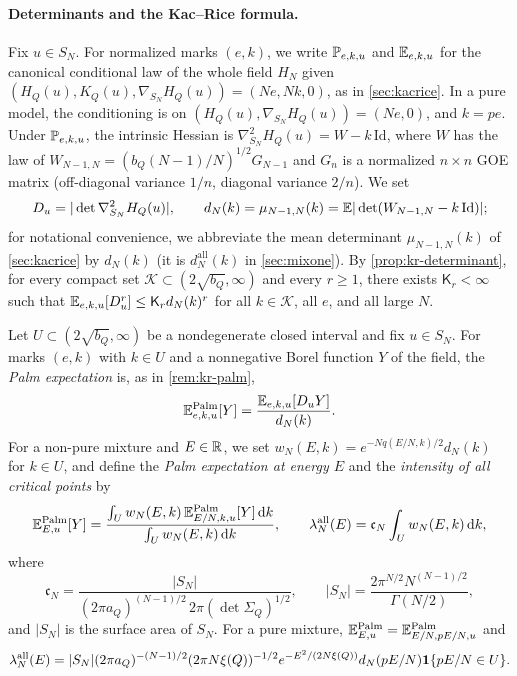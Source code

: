 \paragraph{Determinants and the Kac--Rice formula.}
Fix $u\in S_N$. For normalized marks $(e,k)$, we write $\mathbb P_{e,k,u}$ and $\mathbb E_{e,k,u}$ for the canonical conditional law of the whole field $H_N$ given $(H_Q(u),K_Q(u),\nabla_{S_N}H_Q(u))=(Ne,Nk,0)$, as in \cref{sec:kacrice}. In a pure model, the conditioning is on $(H_Q(u),\nabla_{S_N}H_Q(u))=(Ne,0)$, and $k=pe$. Under $\mathbb P_{e,k,u}$, the intrinsic Hessian is $\nabla^2_{S_N}H_Q(u)=W-k\,\mathrm{Id}$, where $W$ has the law of $W_{N-1,N}=(b_Q(N-1)/N)^{1/2}G_{N-1}$ and $G_n$ is a normalized $n\times n$ GOE matrix (off-diagonal variance $1/n$, diagonal variance $2/n$). We set
\begin{equation}\label{eq:mb-dN}
D_u=|\det\nabla^2_{S_N}H_Q(u)|,\qquad d_N(k)=\mu_{N-1,N}(k)=\mathbb E|\det(W_{N-1,N}-k\,\mathrm{Id})| ;
\end{equation}
for notational convenience, we abbreviate the mean determinant $\mu_{N-1,N}(k)$ of \cref{sec:kacrice} by $d_N(k)$ (it is $d_N^{\mathrm{all}}(k)$ in \cref{sec:mixone}). By \cref{prop:kr-determinant}, for every compact set $\mathcal K\subset(2\sqrt{b_Q},\infty)$ and every $r\ge1$, there exists $\mathsf K_r<\infty$ such that $\mathbb E_{e,k,u}[D_u^r]\le\mathsf K_rd_N(k)^r$ for all $k\in\mathcal K$, all $e$, and all large $N$.

\begin{definition}\label{def:mb-palm}
Let $U\subset(2\sqrt{b_Q},\infty)$ be a nondegenerate closed interval and fix $u\in S_N$. For marks $(e,k)$ with $k\in U$ and a nonnegative Borel function $Y$ of the field, the \emph{Palm expectation} is, as in \cref{rem:kr-palm},
\[
\mathbb E^{\mathrm{Palm}}_{e,k,u}[Y]=\frac{\mathbb E_{e,k,u}[D_uY]}{d_N(k)} .
\]
For a non-pure mixture and $E\in\mathbb R$, we set $w_N(E,k)=e^{-Nq(E/N,k)/2}d_N(k)$ for $k\in U$, and define the \emph{Palm expectation at energy $E$} and the \emph{intensity of all critical points} by
\[
\mathbb E^{\mathrm{Palm}}_{E,u}[Y]=\frac{\int_Uw_N(E,k)\,\mathbb E^{\mathrm{Palm}}_{E/N,k,u}[Y]\,\mathrm d k}{\int_Uw_N(E,k)\,\mathrm d k},\qquad
\lambda^{\mathrm{all}}_N(E)=\mathfrak c_N\int_Uw_N(E,k)\,\mathrm d k,
\]
where
\[
\mathfrak c_N=\frac{|S_N|}{(2\pi a_Q)^{(N-1)/2}\,2\pi(\det\Sigma_Q)^{1/2}},\qquad |S_N|=\frac{2\pi^{N/2}N^{(N-1)/2}}{\Gamma(N/2)},
\]
and $|S_N|$ is the surface area of $S_N$. For a pure mixture, $\mathbb E^{\mathrm{Palm}}_{E,u}=\mathbb E^{\mathrm{Palm}}_{E/N,pE/N,u}$ and
\[
\lambda^{\mathrm{all}}_N(E)=|S_N|(2\pi a_Q)^{-(N-1)/2}(2\pi N\xi(Q))^{-1/2}e^{-E^2/(2N\xi(Q))}d_N(pE/N)\mathbf 1\{pE/N\in U\}.
\]
\end{definition}

